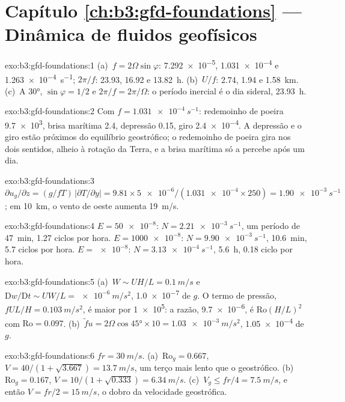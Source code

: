 \section*{Capítulo \ref{ch:b3:gfd-foundations} --- Dinâmica de fluidos geofísicos}

\begin{solution}{exo:b3:gfd-foundations:1}
(a)~$f = 2\Omega\sin\varphi$: \num{7.292e-5}, \num{1.031e-4} e
\qty{1.263e-4}{s^{-1}}; $2\pi/f$: 23.93, 16.92 e \qty{13.82}{h}.
(b)~$U/f$: 2.74, 1.94 e \qty{1.58}{km}. (c)~A \ang{30}, $\sin\varphi =
1/2$ e $2\pi/f = 2\pi/\Omega$: o período inercial é o dia sideral,
\qty{23.93}{h}.
\end{solution}

\begin{solution}{exo:b3:gfd-foundations:2}
Com $f = \qty{1.031e-4}{s^{-1}}$: redemoinho de poeira \num{9.7e3}, brisa marítima 2.4,
depressão 0.15, giro \num{2.4e-4}. A depressão e o giro estão próximos do
equilíbrio geostrófico; o redemoinho de poeira gira nos dois sentidos, alheio
à rotação da Terra, e a brisa marítima só a percebe após um dia.
\end{solution}

\begin{solution}{exo:b3:gfd-foundations:3}
$\partial u_g/\partial z = (g/fT)\,|\partial T/\partial y| = 9.81\times
\num{5e-6}/(\num{1.031e-4}\times250) = \qty{1.90e-3}{s^{-1}}$; em
\qty{10}{km}, o vento de oeste aumenta \qty{19}{m/s}.
\end{solution}

\begin{solution}{exo:b3:gfd-foundations:4}
$E = \num{50e-8}$: $N = \qty{2.21e-3}{s^{-1}}$, um período de \qty{47}{min},
\num{1.27} ciclos por hora. $E = \num{1000e-8}$: $N = \qty{9.90e-3}{s^{-1}}$,
\qty{10.6}{min}, 5.7 ciclos por hora. $E = \num{e-8}$: $N =
\qty{3.13e-4}{s^{-1}}$, \qty{5.6}{h}, 0.18 ciclo por hora.
\end{solution}

\begin{solution}{exo:b3:gfd-foundations:5}
(a)~$W \sim UH/L = \qty{0.1}{m/s}$ e $\mathrm Dw/\mathrm Dt \sim UW/L =
\qty{e-6}{m/s^2}$, \num{1.0e-7} de $g$. O termo de pressão, $fUL/H =
\qty{0.103}{m/s^2}$, é maior por \num{1e5}: a razão, \num{9.7e-6}, é
$\mathrm{Ro}(H/L)^2$ com $\mathrm{Ro} = 0.097$. (b)~$\tilde fu =
2\Omega\cos\ang{45}\times10 = \qty{1.03e-3}{m/s^2}$, \num{1.05e-4} de $g$.
\end{solution}

\begin{solution}{exo:b3:gfd-foundations:6}
$fr = \qty{30}{m/s}$. (a)~$\mathrm{Ro}_g = 0.667$, $V = 40/(1 + \sqrt{3.667})
= \qty{13.7}{m/s}$, um terço mais lento que o geostrófico. (b)~$\mathrm{Ro}_g =
0.167$, $V = 10/(1 + \sqrt{0.333}) = \qty{6.34}{m/s}$. (c)~$V_g \le fr/4 =
\qty{7.5}{m/s}$, e então $V = fr/2 = \qty{15}{m/s}$, o dobro da
velocidade geostrófica.
\end{solution}

